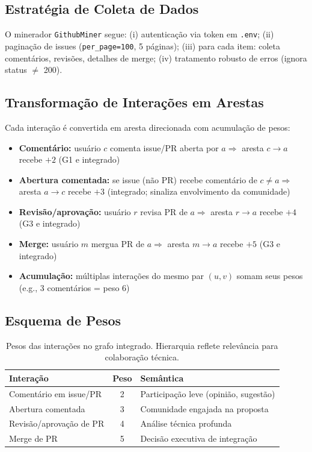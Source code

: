 \documentclass[12pt,a4paper]{article}
\begin{document}
\subsection{Estratégia de Coleta de Dados}

O minerador \texttt{GithubMiner} segue: (i) autenticação via token em \texttt{.env}; (ii) paginação de issues (\texttt{per\_page=100}, 5 páginas); (iii) para cada item: coleta comentários, revisões, detalhes de merge; (iv) tratamento robusto de erros (ignora status $\neq$ 200).

\subsection{Transformação de Interações em Arestas}

Cada interação é convertida em aresta direcionada com acumulação de pesos:
\begin{itemize}
  \item \textbf{Comentário:} usuário $c$ comenta issue/PR aberta por $a \Rightarrow$ aresta $c \to a$ recebe $+2$ (G1 e integrado)
  \item \textbf{Abertura comentada:} se issue (não PR) recebe comentário de $c \neq a \Rightarrow$ aresta $a \to c$ recebe $+3$ (integrado; sinaliza envolvimento da comunidade)
  \item \textbf{Revisão/aprovação:} usuário $r$ revisa PR de $a \Rightarrow$ aresta $r \to a$ recebe $+4$ (G3 e integrado)
  \item \textbf{Merge:} usuário $m$ mergua PR de $a \Rightarrow$ aresta $m \to a$ recebe $+5$ (G3 e integrado)
  \item \textbf{Acumulação:} múltiplas interações do mesmo par $(u, v)$ somam seus pesos (e.g., 3 comentários = peso 6)
\end{itemize}

\subsection{Esquema de Pesos}

\begin{table}[h]
  \centering
  \caption{Pesos das interações no grafo integrado. Hierarquia reflete relevância para colaboração técnica.}
  \label{tab:pesos}
  \begin{tabular}{l|c|p{5.5cm}}
    \toprule
    \textbf{Interação} & \textbf{Peso} & \textbf{Semântica} \\
    \midrule
    Comentário em issue/PR & 2 & Participação leve (opinião, sugestão) \\
    Abertura comentada & 3 & Comunidade engajada na proposta \\
    Revisão/aprovação de PR & 4 & Análise técnica profunda \\
    Merge de PR & 5 & Decisão executiva de integração \\
    \bottomrule
  \end{tabular}
\end{table}
\end{document}
